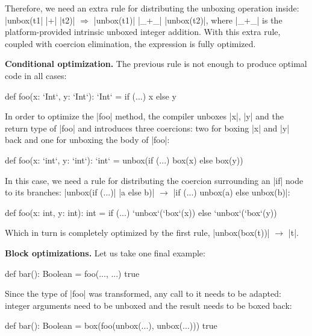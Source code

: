 Therefore, we need an extra rule for distributing the unboxing operation inside: |unbox(t1| |+| |t2)| $\Rightarrow$ |unbox(t1)| |_+_| |unbox(t2)|, where |_+_| is the platform-provided intrinsic unboxed integer addition. With this extra rule, coupled with coercion elimination, the expression is fully  optimized.

\textbf{Conditional optimization.} The previous rule is not enough to produce optimal code in all cases:

\begin{lstlisting-nobreak}
 def foo(x: `Int`, y: `Int`): `Int` =
   if (...) x else y
\end{lstlisting-nobreak}

In order to optimize the |foo| method, the compiler unboxes |x|, |y| and the return type of |foo| and introduces three coercions: two for boxing |x| and |y| back and one for unboxing the body of |foo|:

\begin{lstlisting-nobreak}
 def foo(x: `int`, y: `int`): `int` =
   unbox(if (...) box(x) else box(y))
\end{lstlisting-nobreak}

In this case, we need a rule for distributing the coercion surrounding an |if| node to its branches: |unbox(if (...)| |a else b)| $\rightarrow$ |if (...) unbox(a) else unbox(b)|:

\begin{lstlisting-nobreak}
 def foo(x: int, y: int): int =
   if (...) `unbox`(`box`(x)) else `unbox`(`box`(y))
\end{lstlisting-nobreak}

Which in turn is completely optimized by the first rule, |unbox(box(t))| $\rightarrow$ |t|.

\textbf{Block optimizations.} Let us take one final example:

\begin{lstlisting-nobreak}
 def bar(): Boolean = {
   foo(..., ...)
   true
 }
\end{lstlisting-nobreak}

Since the type of |foo| was transformed, any call to it needs to be adapted: integer arguments need to be unboxed and the result needs to be boxed back:

\begin{lstlisting-nobreak}
 def bar(): Boolean = {
   box(foo(unbox(...), unbox(...)))
   true
 }
\end{lstlisting-nobreak}


